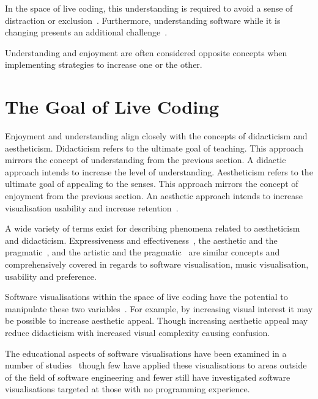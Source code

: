 In the space of live coding, this understanding is required to avoid a sense of distraction or exclusion~\cite{McLean2010a}. Furthermore, understanding software while it is changing presents an additional challenge~\cite{Eisenbarth2003}.

Understanding and enjoyment are often considered opposite concepts when implementing strategies to increase one or the other. 

\section{The Goal of Live Coding}

\more

Enjoyment and understanding align closely with the concepts of didacticism and aestheticism. Didacticism refers to the ultimate goal of teaching. This approach mirrors the concept of understanding from the previous section. A didactic approach intends to increase the level of understanding. Aestheticism refers to the ultimate goal of appealing to the senses. This approach mirrors the concept of enjoyment from the previous section. An aesthetic approach intends to increase visualisation usability and increase retention~\cite{Cawthon2007}. 

A wide variety of terms exist for describing phenomena related to aestheticism and didacticism. Expressiveness and effectiveness~\cite{Hundhausen1996,Hundhausen2002}, the aesthetic and the pragmatic~\cite{Angeli2006}, and the artistic and the pragmatic~\cite{Kosara2007} are similar concepts and comprehensively covered in regards to software visualisation, music visualisation, usability and preference.

Software visualisations within the space of live coding have the potential to manipulate these two variables~\cite{Iru,McLean2010a}. For example, by increasing visual interest it may be possible to increase aesthetic appeal. Though increasing aesthetic appeal may reduce didacticism with increased visual complexity causing confusion.

The educational aspects of software visualisations have been examined in a number of studies~\cite{Baecker1998,Hundhausen2007} though few have applied these visualisations to areas outside of the field of software engineering and fewer still have investigated software visualisations targeted at those with no programming experience.

